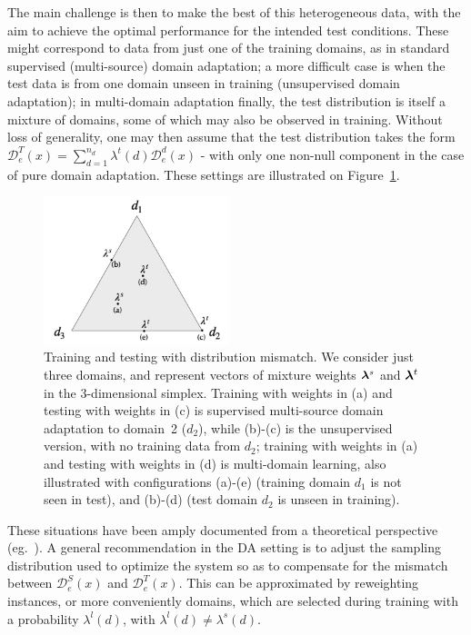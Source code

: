 The main challenge is then to make the best of this heterogeneous data, with the aim to achieve the optimal performance for the intended test conditions. These might correspond to data from just one of the training domains, as in standard supervised (multi-source) domain adaptation; a more difficult case is when the test data is from one domain unseen in training (unsupervised domain adaptation); in multi-domain adaptation finally, the test distribution is itself a mixture of domains, some of which may also be observed in training.  Without loss of generality, one may then assume that the test distribution takes the form $\mathcal{D}^{T}_e(x) = \sum_{d=1}^{n_d} \lambda^{t}(d) \mathcal{D}_e^d(x)$ - with only one non-null  component in the case of pure domain adaptation. These settings are illustrated on Figure~\ref{fig:mdmt-lambdas-chap7}.
\begin{figure}[h]
  \centering
  \includegraphics[width=0.48\textwidth]{graphics/mdmt-lambdas}
  \caption{Training and testing with distribution mismatch. We consider just three domains, and represent vectors of mixture weights $\bm{\lambda}^{s}$ and $\bm{\lambda}^{t}$ in the 3-dimensional simplex. Training with weights in (a) and testing with weights in (c) is supervised multi-source domain adaptation to domain~2 ($d_2$), while (b)-(c) is the unsupervised version, with no training data from $d_2$; training with weights in (a) and testing with weights in (d) is multi-domain learning, also illustrated with configurations (a)-(e) (training domain $d_1$ is not seen in test), and (b)-(d)  (test domain $d_2$ is unseen in training).}\label{fig:mdmt-lambdas-chap7}
\end{figure}

These situations have been amply documented from a theoretical perspective (eg.\ \citet{Mansour09multiple,Mansour09domain,Hoffman18algorithms}). A general recommendation in the DA setting is to adjust the sampling distribution used to optimize the system so as to compensate for the mismatch between $\mathcal{D}_e^S(x)$ and $\mathcal{D}_e^T(x)$. This can be approximated by reweighting instances, or more conveniently domains, which are selected during training with a probability $\lambda^{l}(d)$, with $\lambda^{l}(d) \neq \lambda^{s}(d)$.

